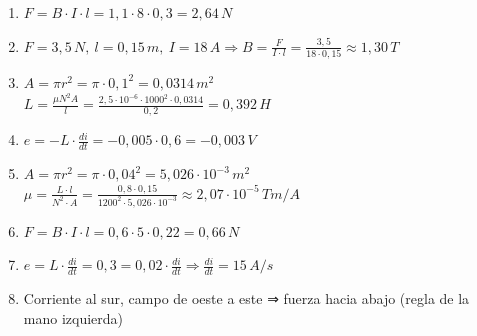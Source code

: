 \documentclass[a4paper,12pt]{article}
\begin{document}
\begin{enumerate}
\item $F = B \cdot I \cdot l = 1{,}1 \cdot 8 \cdot 0{,}3 = \boxed{2{,}64\,N}$

\item $F = 3{,}5\,N,\ l = 0{,}15\,m,\ I = 18\,A \Rightarrow B = \frac{F}{I \cdot l} = \frac{3{,}5}{18 \cdot 0{,}15} \approx \boxed{1{,}30\,T}$

\item $A = \pi r^2 = \pi \cdot 0{,}1^2 = 0{,}0314\,m^2$\\
$L = \frac{\mu N^2 A}{l} = \frac{2{,}5 \cdot 10^{-6} \cdot 1000^2 \cdot 0{,}0314}{0{,}2} = \boxed{0{,}392\,H}$

\item $e = -L \cdot \frac{di}{dt} = -0{,}005 \cdot 0{,}6 = \boxed{-0{,}003\,V}$

\item $A = \pi r^2 = \pi \cdot 0{,}04^2 = 5{,}026 \cdot 10^{-3}\,m^2$\\
$\mu = \frac{L \cdot l}{N^2 \cdot A} = \frac{0{,}8 \cdot 0{,}15}{1200^2 \cdot 5{,}026 \cdot 10^{-3}} \approx \boxed{2{,}07 \cdot 10^{-5}\,Tm/A}$

\item $F = B \cdot I \cdot l = 0{,}6 \cdot 5 \cdot 0{,}22 = \boxed{0{,}66\,N}$

\item $e = L \cdot \frac{di}{dt} = 0{,}3 = 0{,}02 \cdot \frac{di}{dt} \Rightarrow \frac{di}{dt} = \boxed{15\,A/s}$

\item Corriente al sur, campo de oeste a este ⇒ fuerza hacia abajo (regla de la mano izquierda)

\end{enumerate}
\end{document}
